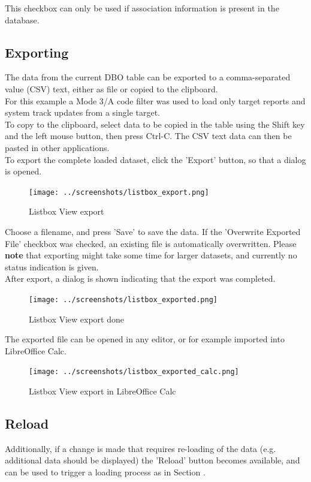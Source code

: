 This checkbox can only be used if association information is present in the database.

\subsection{Exporting}
\label{sec:exporting}

The data from the current DBO table can be exported to a comma-separated value (CSV) text, either as file or copied to the clipboard. \\

For this example a Mode 3/A code filter was used to load only target reports and system track updates from a single target. \\

To copy to the clipboard, select data to be copied in the table using the Shift key and the left mouse button, then press Ctrl-C. The CSV text data can then be pasted in other applications. \\

To export the complete loaded dataset, click the 'Export' button, so that a dialog is opened.

\begin{figure}[H]
    \hspace*{-2cm}
    \texttt{[image: ../screenshots/listbox\_export.png]}
  \caption{Listbox View export}
\end{figure}

Choose a filename, and press 'Save' to save the data. If the 'Overwrite Exported File' checkbox was checked, an existing file is automatically overwritten. Please \textbf{note} that exporting might take some time for larger datasets, and currently no status indication is given.\\

After export, a dialog is shown indicating that the export was completed.

\begin{figure}[H]
  \center
    \texttt{[image: ../screenshots/listbox\_exported.png]}
  \caption{Listbox View export done}
\end{figure}

The exported file can be opened in any editor, or for example imported into LibreOffice Calc.

\begin{figure}[H]
    \hspace*{-2.5cm}
    \texttt{[image: ../screenshots/listbox\_exported\_calc.png]}
  \caption{Listbox View export in LibreOffice Calc}
\end{figure}
 
\subsection{Reload}

Additionally, if a change is made that requires re-loading of the data (e.g. additional data should be displayed) the 'Reload' button becomes available, and can be used to trigger a loading process as in Section . 

